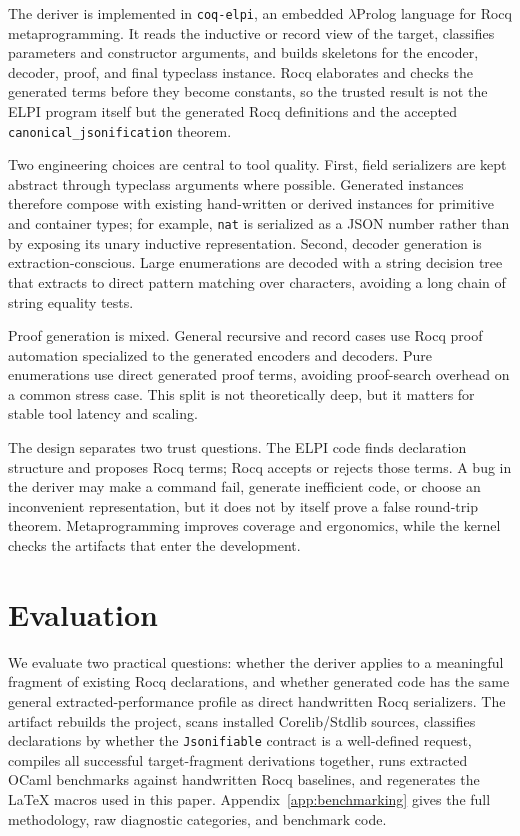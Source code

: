 \documentclass[runningheads]{llncs}
\newcommand{\coqelpi}{\texttt{coq-elpi}\xspace}
\begin{document}
The deriver is implemented in \coqelpi, an embedded $\lambda$Prolog language for
Rocq metaprogramming.  It reads the inductive or record view of the target,
classifies parameters and constructor arguments, and builds skeletons for the
encoder, decoder, proof, and final typeclass instance.  Rocq elaborates and
checks the generated terms before they become constants, so the trusted result
is not the ELPI program itself but the generated Rocq definitions and the
accepted \texttt{canonical\_jsonification} theorem.

Two engineering choices are central to tool quality.  First, field serializers
are kept abstract through typeclass arguments where possible.  Generated
instances therefore compose with existing hand-written or derived instances for
primitive and container types; for example, \texttt{nat} is serialized as a JSON
number rather than by exposing its unary inductive representation.  Second,
decoder generation is extraction-conscious.  Large enumerations are decoded
with a string decision tree that extracts to direct pattern matching over
characters, avoiding a long chain of string equality tests.

Proof generation is mixed.  General recursive and record cases use Rocq proof
automation specialized to the generated encoders and decoders.  Pure
enumerations use direct generated proof terms, avoiding proof-search overhead on
a common stress case.  This split is not theoretically deep, but it matters for
stable tool latency and scaling.

The design separates two trust questions.  The ELPI code finds declaration
structure and proposes Rocq terms; Rocq accepts or rejects those terms.  A bug in
the deriver may make a command fail, generate inefficient code, or choose an
inconvenient representation, but it does not by itself prove a false round-trip
theorem.  Metaprogramming improves coverage and ergonomics, while the kernel
checks the artifacts that enter the development.

\section{Evaluation}
\label{sec:evaluation}

We evaluate two practical questions: whether the deriver applies to a meaningful
fragment of existing Rocq declarations, and whether generated code has the same
general extracted-performance profile as direct handwritten Rocq serializers.
The artifact rebuilds the project, scans installed Corelib/Stdlib sources,
classifies declarations by whether the \texttt{Jsonifiable} contract is a
well-defined request, compiles all successful target-fragment derivations
together, runs extracted OCaml benchmarks against handwritten Rocq baselines,
and regenerates the LaTeX macros used in this paper.
Appendix~\ref{app:benchmarking} gives the full methodology, raw diagnostic
categories, and benchmark code.
\end{document}
